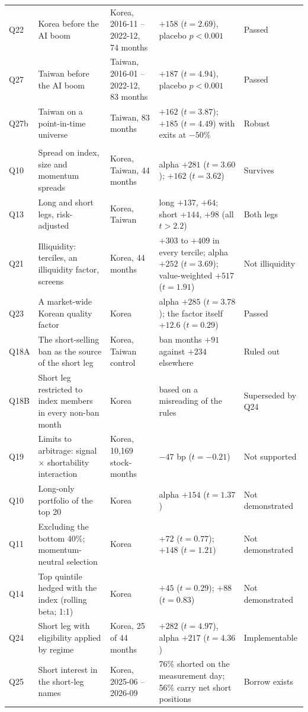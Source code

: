 \documentclass[12pt,a4paper]{article}
\begin{document}
\begin{longtable}{@{}L{1.3cm} L{4.4cm} L{2.6cm} L{4.6cm} L{2.0cm}@{}}
Q22 & Korea before the AI boom & Korea, 2016-11 -- 2022-12, 74 months & $+158$ ($t=2.69$), placebo $p<0.001$ & Passed \\
Q27 & Taiwan before the AI boom & Taiwan, 2016-01 -- 2022-12, 83 months & $+187$ ($t=4.94$), placebo $p<0.001$ & Passed \\
Q27b & Taiwan on a point-in-time universe & Taiwan, 83 months & $+162$ ($t=3.87$); $+185$ ($t=4.49$) with exits at $-50\%$ & Robust \\
\addlinespace
{} \\
Q10 & Spread on index, size and momentum spreads & Korea, Taiwan, 44 months & alpha $+281$ ($t=3.60$); $+162$ ($t=3.62$) & Survives \\
Q13 & Long and short legs, risk-adjusted & Korea, Taiwan & long $+137$, $+64$; short $+144$, $+98$ (all $t>2.2$) & Both legs \\
Q21 & Illiquidity: terciles, an illiquidity factor, screens & Korea, 44 months & $+303$ to $+409$ in every tercile; alpha $+252$ ($t=3.69$); value-weighted $+517$ ($t=1.91$) & Not illiquidity \\
Q23 & A market-wide Korean quality factor & Korea & alpha $+285$ ($t=3.78$); the factor itself $+12.6$ ($t=0.29$) & Passed \\
Q18A & The short-selling ban as the source of the short leg & Korea, Taiwan control & ban months $+91$ against $+234$ elsewhere & Ruled out \\
Q18B & Short leg restricted to index members in every non-ban month & Korea & based on a misreading of the rules & Superseded by Q24 \\
Q19 & Limits to arbitrage: signal $\times$ shortability interaction & Korea, 10{,}169 stock-months & $-47$ bp ($t=-0.21$) & Not supported \\
Q10 & Long-only portfolio of the top 20 & Korea & alpha $+154$ ($t=1.37$) & Not demonstrated \\
Q11 & Excluding the bottom 40\%; momentum-neutral selection & Korea & $+72$ ($t=0.77$); $+148$ ($t=1.21$) & Not demonstrated \\
Q14 & Top quintile hedged with the index (rolling beta; 1:1) & Korea & $+45$ ($t=0.29$); $+88$ ($t=0.83$) & Not demonstrated \\
Q24 & Short leg with eligibility applied by regime & Korea, 25 of 44 months & $+282$ ($t=4.97$), alpha $+217$ ($t=4.36$) & Implementable \\
Q25 & Short interest in the short-leg names & Korea, 2025-06 -- 2026-09 & 76\% shorted on the measurement day; 56\% carry net short positions & Borrow exists \\

\end{longtable}
\end{document}
